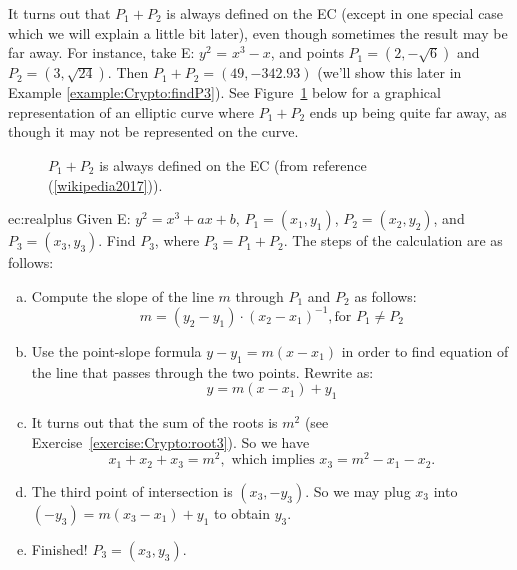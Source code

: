 It turns out that $P_1 + P_2$ is always defined on the EC (except in one special case which we will explain a little bit later), even though sometimes the result may be far away.  For instance, take E: $ y^2$ = $x^3 - x$, and points $P_1 = (2, -\sqrt{6})$ and $P_2 = (3, \sqrt{24})$.  Then $P_1 + P_2 = (49,-342.93)$ (we'll show this later in Example \ref{example:Crypto:findP3}). See Figure~\ref{fig:DH:DHKE_16} below for a graphical representation of an elliptic curve where $P_1 + P_2$ ends up being quite far away, as though it may not be represented on the curve.
\begin{figure}[H]
	  \caption{\label{fig:DH:DHKE_16} $P_1 + P_2$ is always defined on the EC (from reference (\ref{wikipedia2017})).}
\end{figure}
\begin{example}{ec:realplus}
Given E: $y^2 = x^3 + ax + b$, $P_1 = (x_1, y_1)$, $P_2 = (x_2, y_2)$, and $P_3 = (x_3, y_3)$. Find $P_3$, where $ P_3 =  P_1 + P_2$.
The steps of the calculation are as follows:
\begin{enumerate}[(a)]
\item
Compute the slope of the line $m$ through $P_1$ and $P_2$ as follows:  \[ m =(y_2 - y_1) \cdot (x_2- x_1)^{-1}, \text{for } P_1 \neq P_2  \] 
\item
Use the point-slope formula $y - y_1 = m(x-x_1)$  in order to find equation of the line that passes through the two points.  Rewrite as: \[y  = m(x-x_1) + y_1\]
\item
It turns out that the sum of the roots is $m^2$ (see Exercise~\ref{exercise:Crypto:root3}). So we have
\[x_1 + x_2 + x_3 = m^2, \text{ which implies } x_3 =   m^2 -  x_1 - x_2.\]
\item  The third point of intersection is $(x_3, -y_3)$. So  we may plug $x_3$ into $(-y_3)  = m(x_3-x_1) + y_1$ to obtain $y_3$. 
\item Finished!  $P_3 = (x_3,y_3)$.
\end{enumerate}
 \end{example} 

